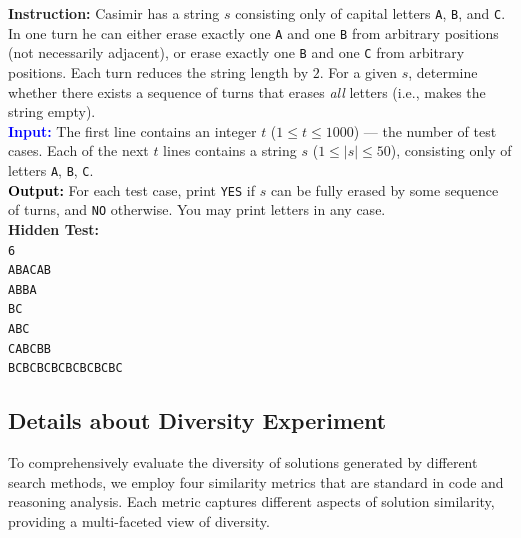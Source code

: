 \documentclass[11pt]{article}
\theoremstyle{definition}
\theoremstyle{remark}
\begin{document}
\begin{tcolorbox}[colback=bg,
title=\textbf{Question and Hidden Test in CodeContest}]
\begin{flushleft}
\textcolor{softblue}{\textbf{Instruction:}}
Casimir has a string $s$ consisting only of capital letters \texttt{A}, \texttt{B}, and \texttt{C}. In one turn he can either erase exactly one \texttt{A} and one \texttt{B} from arbitrary positions (not necessarily adjacent), or erase exactly one \texttt{B} and one \texttt{C} from arbitrary positions. Each turn reduces the string length by $2$. For a given $s$, determine whether there exists a sequence of turns that erases \emph{all} letters (i.e., makes the string empty).\\[4pt]

\textcolor{blue}{\textbf{Input:}} The first line contains an integer $t$ ($1 \le t \le 1000$) — the number of test cases. Each of the next $t$ lines contains a string $s$ ($1 \le |s| \le 50$), consisting only of letters \texttt{A}, \texttt{B}, \texttt{C}.\\[2pt]

\textcolor{Black}{\textbf{Output:}} For each test case, print \texttt{YES} if $s$ can be fully erased by some sequence of turns, and \texttt{NO} otherwise. You may print letters in any case.\\[6pt]

\textbf{Hidden Test:}\\
\texttt{6}\\
\texttt{ABACAB}\\
\texttt{ABBA}\\
\texttt{BC}\\
\texttt{ABC}\\
\texttt{CABCBB}\\
\texttt{BCBCBCBCBCBCBCBC}\\[2pt]
\end{flushleft}
\end{tcolorbox}


\subsection{Details about Diversity Experiment}
\label{apps:diversity-details}
To comprehensively evaluate the diversity of solutions generated by different search methods, we employ four similarity metrics that are standard in code and reasoning analysis. Each metric captures different aspects of solution similarity, providing a multi-faceted view of diversity.
\end{document}
